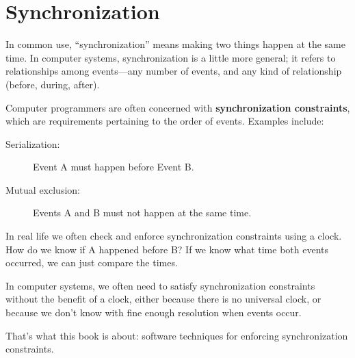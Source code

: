 \section{Synchronization}
\label{synch}

In common use, ``synchronization'' means making two things happen
at the same time.  In computer systems, synchronization is a little
more general; it refers to relationships among events---any number
of events, and any kind of relationship (before, during, after).

Computer programmers are often concerned with {\bf synchronization
constraints}, which are requirements pertaining to the order of
events.  Examples include:

\begin{description}

\item[Serialization:] Event A must happen before Event B.

\item[Mutual exclusion:] Events A and B must not happen at the same time.

\end{description}

In real life we often check and enforce synchronization constraints 
using a clock.  How do we know if A happened before B?  If we
know what time both events occurred, we can just compare the times.

In computer systems, we often need to satisfy synchronization
constraints without the benefit of a clock, either because there
is no universal clock, or because we don't know with fine enough
resolution when events occur.

That's what this book is about: software techniques for enforcing
synchronization constraints.

